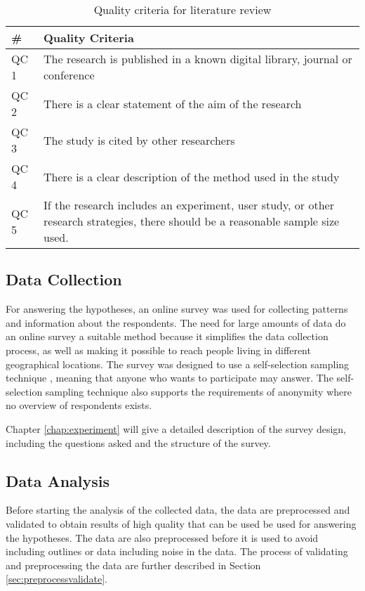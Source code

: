         \begin{table}[H]
          \centering
          \begin{tabular}{| l | p{10cm} |}
            \hline
            {\bf \#} & {\bf Quality Criteria} \\ \hline
            QC 1 & The research is published in a known digital library, journal or conference\\ \hline
            QC 2 & There is a clear statement of the aim of the research\\ \hline
            QC 3 & The study is cited by other researchers\\ \hline
            QC 4 & There is a clear description of the method used in the study\\ \hline
            QC 5 & If the research includes an experiment, user study, or other research strategies, there should be a reasonable sample size used. \\ \hline
          \end{tabular}
          \caption{Quality criteria for literature review}
          \label{tab:QualityCriteria}
        \end{table}

    \subsection{Data Collection}

      For answering the hypotheses, an online survey was used for collecting patterns and information about the respondents. The need for large amounts of data do an online survey a suitable method because it simplifies the data collection process, as well as making it possible to reach people living in different geographical locations. The survey was designed to use a self-selection sampling technique \cite{empiriske}, meaning that anyone who wants to participate may answer. The self-selection sampling technique also supports the requirements of anonymity where no overview of respondents exists. 

      Chapter \ref{chap:experiment} will give a detailed description of the survey design, including the questions asked and the structure of the survey.

    \subsection{Data Analysis}
      Before starting the analysis of the collected data, the data are preprocessed and validated to obtain results of high quality that can be used be used for answering the hypotheses. The data are also preprocessed before it is used to avoid including outlines or data including noise in the data. The process of validating and preprocessing the data are further described in Section \ref{sec:preprocessvalidate}.

